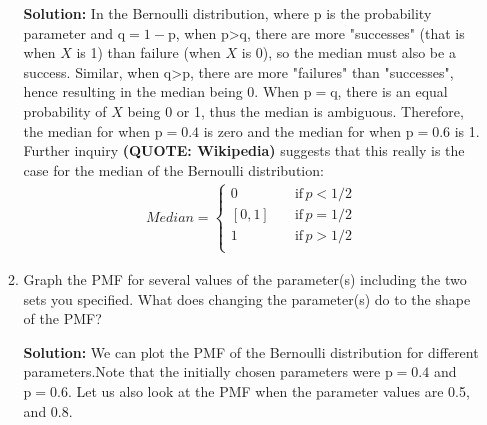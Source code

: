 \documentclass{article}\usepackage[]{graphicx}\usepackage[]{color}
\begin{document}
\begin{enumerate}
\begin{enumerate}
	\textbf{Solution:} In the Bernoulli distribution, where p is the probability parameter and $\mathrm{q = 1 - p}$, when p\textgreater q, there are more "successes" (that is when $X$ is 1) than failure (when $X$ is 0), so the median must also be a success. Similar, when q\textgreater p, there are more "failures" than "successes", hence resulting in the median being 0. When $\mathrm{p = q}$, there is an equal probability of $X$ being 0 or 1, thus the median is ambiguous. Therefore, the median for when $\mathrm{p = 0.4}$ is zero and the median for when $\mathrm{p = 0.6}$ is 1. Further inquiry \textbf{(QUOTE: Wikipedia)} suggests that this really is the case for the median of the Bernoulli distribution:\
	\begin{align*}
	Median=\begin{cases}
          0 \quad &\text{if} \, p < 1/2\\
          [0,1] \quad &\text{if} \, p = 1/2\\
          1 \quad &\text{if} \, p > 1/2\\
     \end{cases}
	\end{align*}
	\item \label{q3PMF} Graph the PMF for several values of the parameter(s) 
	including the two sets you specified. What does changing the parameter(s) do 
	to the shape of the PMF?
	
	\textbf{Solution:} We can plot the PMF of the Bernoulli distribution for different parameters.Note that the initially chosen parameters were $\mathrm{p =0.4}$ and $\mathrm{p=0.6}$. Let us also look at the PMF when the parameter values are 0.5, and 0.8.
	

\end{enumerate}
\end{enumerate}
\end{document}
